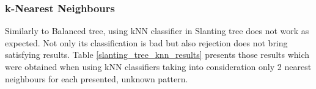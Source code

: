 \subsubsection{k-Nearest Neighbours}

Similarly to Balanced tree, using kNN classifier in Slanting tree does not work as expected. Not only its classification is bad but also rejection does not bring satisfying results. Table \ref{slanting_tree_knn_results} presents those results which were obtained when using kNN classifiers taking into consideration only 2 nearest neighbours for each presented, unknown pattern.

\begin{table}[htp]
	\centering
	\caption{Results for Slanting tree using k-Nearest Neighbours classifier with n\_neighbours=2}
	\label{slanting_tree_knn_results}
\end{table}

